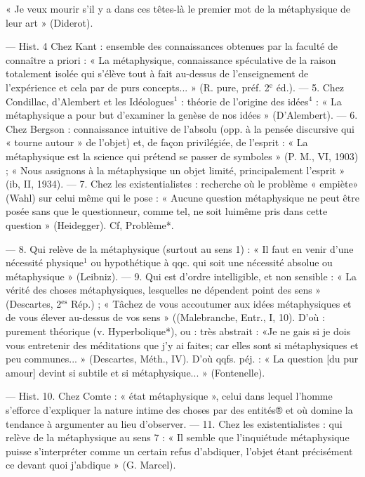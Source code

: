 \begin{itemize}[leftmargin=1cm, label=, itemsep=1pt]
« Je veux mourir s’il y a dans ces
têtes-là le premier mot de la métaphysique de leur art » (Diderot).

— Hist. 4 Chez Kant : ensemble
des connaissances obtenues par la
faculté de connaître a priori : « La
métaphysique, connaissance spéculative de la raison totalement isolée
qui s'élève tout à fait au-dessus de
l’enseignement de l'expérience et
cela par de purs concepts... »
(R. pure, préf. 2$^\text{e}$ éd.). — 5. Chez
Condillac, d’Alembert et les Idéologues$^1$ : théorie de l’origine des
idées$^4$ : « La métaphysique a pour
but d'examiner la genèse de nos
idées » (D’Alembert). — 6. Chez
Bergson : connaissance intuitive de
l'absolu (opp. à la pensée discursive
qui « tourne autour » de l’objet) et,
de façon privilégiée, de l'esprit : « La
métaphysique est la science qui
prétend se passer de symboles »
(P. M., VI, 1903) ; « Nous assignons
à la métaphysique un objet limité,
principalement l'esprit » (ib, II,
1934). — 7. Chez les existentialistes :
recherche où le problème « empiète»
(Wahl) sur celui même qui le pose :
« Aucune question métaphysique ne
peut être posée sans que le questionneur, comme tel, ne soit luimême pris dans cette question »
(Heidegger). Cf, Problème*.

 — 8. Qui relève
de la métaphysique (surtout au
sens 1) : « Il faut en venir d’une
nécessité physique$^1$ ou hypothétique
à qqc. qui soit une nécessité absolue
ou métaphysique » (Leibniz). —
9. Qui est d’ordre intelligible, et non
sensible : « La vérité des choses métaphysiques, lesquelles ne dépendent point des sens » (Descartes,
2$^\text{es}$ Rép.) ; « Tâchez de vous accoutumer aux idées métaphysiques et
de vous élever au-dessus de vos
sens » ((Malebranche, Entr., I, 10).
D'où : purement théorique (v. Hyperbolique*), ou : très abstrait : «Je ne
gais si je dois vous entretenir des
méditations que j'y ai faites; car
elles sont si métaphysiques et peu
communes... » (Descartes, Méth.,
IV). D'où qqfs. péj. : « La question
[du pur amour] devint si subtile et
si métaphysique... » (Fontenelle).

— Hist. 10. Chez Comte : « état
métaphysique », celui dans lequel
l'homme s'efforce d'expliquer la
nature intime des choses par des
entités® et où domine la tendance à
argumenter au lieu d'observer. —
11. Chez les existentialistes : qui
relève de la métaphysique au sens 7 :
« Il semble que l'inquiétude métaphysique puisse s’interpréter comme
un certain refus d’abdiquer, l’objet
étant précisément ce devant quoi
j'abdique » (G. Marcel).


\end{itemize}
